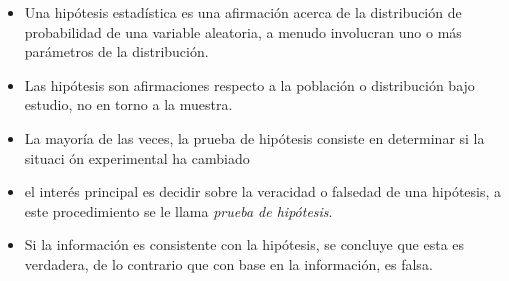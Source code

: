 \begin{itemize}
\item Una hip\'otesis estad\'istica es una afirmaci\'on  acerca de la distribuci\'on de probabilidad de una variable aleatoria, a menudo involucran uno o m\'as par\'ametros de la distribuci\'on.

\item Las hip\'otesis son afirmaciones respecto a la poblaci\'on o distribuci\'on bajo estudio, no en torno a la muestra.

\item La mayor\'ia de las veces, la prueba de hip\'otesis consiste en determinar si la situaci \'on experimental ha cambiado

\item el inter\'es principal es decidir sobre la veracidad o falsedad de una hip\'otesis, a este procedimiento se le llama \textit{prueba de hip\'otesis}.

\item Si la informaci\'on es consistente con la hip\'otesis, se concluye que esta es verdadera, de lo contrario que con base en la informaci\'on, es falsa.

\end{itemize}


